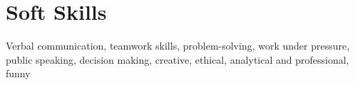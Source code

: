 \documentclass[letterpaper,11pt]{article}
\begin{document}

\section{Soft Skills}
\begin{itemize}[leftmargin=0.15in, label={}]
\small{
\item{Verbal communication, teamwork skills, problem-solving, work under pressure, public speaking, decision making, creative, ethical, analytical and professional, funny}
}
\end{itemize}

\end{document}
